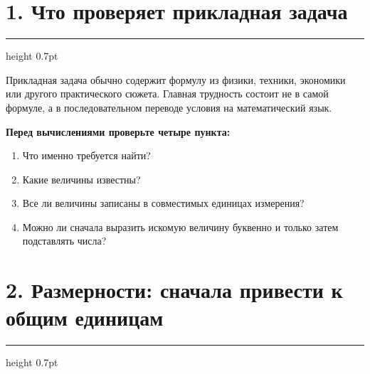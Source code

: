 \documentclass[a4paper,12pt]{article}
\newcommand{\sectionline}{%
    \par\vspace{0.15em}
    {\color{lightaccent}\hrule height 0.7pt}
    \vspace{0.7em}
}
\newcommand{\key}[1]{\textcolor{darkaccent}{\textbf{#1}}}
\begin{document}
\section*{\textcolor{darkaccent}{1. Что проверяет прикладная задача}}

\sectionline

Прикладная задача обычно содержит формулу из физики, техники, экономики
или другого практического сюжета. Главная трудность состоит не в самой
формуле, а в последовательном переводе условия на математический язык.

\key{Перед вычислениями проверьте четыре пункта:}

\begin{enumerate}
    \item Что именно требуется найти?
    \item Какие величины известны?
    \item Все ли величины записаны в совместимых единицах измерения?
    \item Можно ли сначала выразить искомую величину буквенно и только затем
    подставлять числа?
\end{enumerate}

\begin{center}
\end{center}

\section*{\textcolor{darkaccent}{2. Размерности: сначала привести к общим единицам}}

\sectionline
\end{document}
